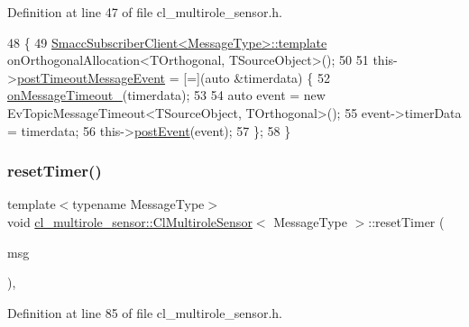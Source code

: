 Definition at line 47 of file cl\+\_\+multirole\+\_\+sensor.\+h.


\begin{DoxyCode}
48   \{
49     \hyperlink{classsmacc_1_1client__bases_1_1SmaccSubscriberClient}{SmaccSubscriberClient<MessageType>::template} 
      onOrthogonalAllocation<TOrthogonal, TSourceObject>();
50 
51     this->\hyperlink{classcl__multirole__sensor_1_1ClMultiroleSensor_a61a6e5dce7f1b34508701a8bc8f06ab9}{postTimeoutMessageEvent} = [=](\textcolor{keyword}{auto} &timerdata) \{
52       \hyperlink{classcl__multirole__sensor_1_1ClMultiroleSensor_afd37257b949c421d4f579b47352be95f}{onMessageTimeout\_}(timerdata);
53 
54       \textcolor{keyword}{auto} \textcolor{keyword}{event} = \textcolor{keyword}{new} EvTopicMessageTimeout<TSourceObject, TOrthogonal>();
55       \textcolor{keyword}{event}->timerData = timerdata;
56       this->\hyperlink{classsmacc_1_1ISmaccClient_a21a79203cb44fc717d4d977c190327c6}{postEvent}(event);
57     \};
58   \}
\end{DoxyCode}
\mbox{\label{classcl__multirole__sensor_1_1ClMultiroleSensor_afa5b63048466234906971db69677b3f0}} 
\subsubsection{\texorpdfstring{reset\+Timer()}{resetTimer()}}
{\footnotesize\ttfamily template$<$typename Message\+Type$>$ \\
void \hyperlink{classcl__multirole__sensor_1_1ClMultiroleSensor}{cl\+\_\+multirole\+\_\+sensor\+::\+Cl\+Multirole\+Sensor}$<$ Message\+Type $>$\+::reset\+Timer (\begin{DoxyParamCaption}\item[{const Message\+Type \&}]{msg }\end{DoxyParamCaption})\hspace{0.3cm}{\ttfamily [inline]}, {\ttfamily [protected]}}



Definition at line 85 of file cl\+\_\+multirole\+\_\+sensor.\+h.


